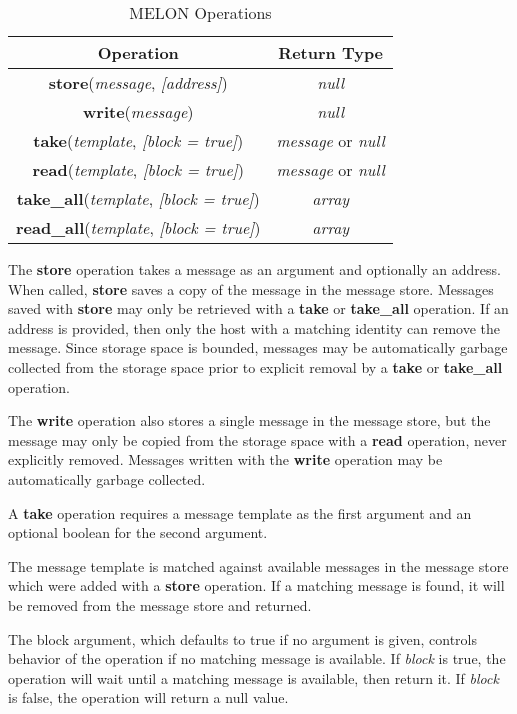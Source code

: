 \begin{table}
\centering
\begin{tabular}{|c|c|}
\hline
\textbf{Operation} & \textbf{Return Type} \\ \hline
\textbf{store}(\textit{message}, \textit{[address]}) & \textit{null} \\ \hline
\textbf{write}(\textit{message}) & \textit{null} \\ \hline
\textbf{take}(\textit{template}, \textit{[block = true]}) & \textit{message} or \textit{null} \\ \hline
\textbf{read}(\textit{template}, \textit{[block = true]}) & \textit{message} or \textit{null} \\ \hline
\textbf{take\_all}(\textit{template}, \textit{[block = true]}) & \textit{array} \\ \hline
\textbf{read\_all}(\textit{template}, \textit{[block = true]}) & \textit{array} \\ \hline
\end{tabular}
\caption{MELON Operations}
\end{table}

The \textbf{store} operation takes a message as an argument and optionally an address. When called, \textbf{store} saves a copy of the message in the message store. Messages saved with \textbf{store} may only be retrieved with a \textbf{take} or \textbf{take\_all} operation. If an address is provided, then only the host with a matching identity can remove the message. Since storage space is bounded, messages may be automatically garbage collected from the storage space prior to explicit removal by a \textbf{take} or \textbf{take\_all} operation.

The \textbf{write} operation also stores a single message in the message store, but the message may only be copied from the storage space with a \textbf{read} operation, never explicitly removed. Messages written with the \textbf{write} operation may be automatically garbage collected.

A \textbf{take} operation requires a message template as the first argument and an optional boolean for the second argument.

The message template is matched against available messages in the message store which were added with a \textbf{store} operation. If a matching message is found, it will be removed from the message store and returned.

The block argument, which defaults to true if no argument is given, controls behavior of the operation if no matching message is available. If \textit{block} is true, the operation will wait until a matching message is available, then return it. If \textit{block} is false, the operation will return a null value.

